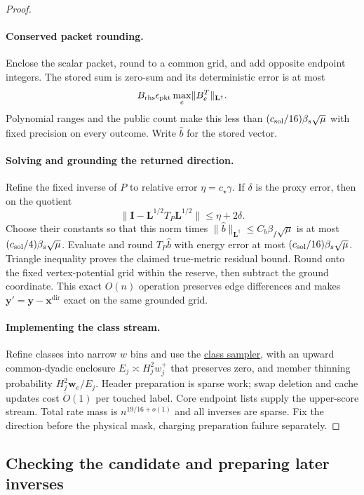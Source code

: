 \documentclass[11pt]{article}
\theoremstyle{remark}
\newcommand{\II}{\mathbf I}
\newcommand{\LL}{\mathbf L}
\newcommand{\ww}{\mathbf w}
\newcommand{\yy}{\mathbf y}
\newcommand{\xxdir}{\mathbf{x}^{\mathrm{dir}}}
\newcommand{\norm}[1]{\lVert#1\rVert}
\renewcommand{\O}{\ddot{O}}
\begin{document}
\begin{proof}
\paragraph{Conserved packet rounding.}
Enclose the scalar packet, round to a common grid, and add opposite endpoint
integers.
The stored sum is zero-sum and its deterministic error is at most
\[
 B_{\rm rhs}\epsilon_{\rm pkt}
                  \max_e\norm{B_e^T}_{\LL^\dagger}.
\]
Polynomial ranges and the public count make this less than $(c_{\rm
sol}/16)\beta_s\sqrt\mu$ with fixed precision on every outcome.
Write $\widehat b$ for the stored vector.

\paragraph{Solving and grounding the returned direction.}
Refine the fixed inverse of $P$ to relative error $\eta=c_\star\gamma$.
If $\delta$ is the proxy error, then on the quotient
\[
 \norm{\II-\LL^{1/2}T_P\LL^{1/2}}
                              \le\eta+2\delta.
\]
Choose their constants so that this norm times $\norm{\widehat
b}_{\LL^\dagger}\le C_b\beta_f\sqrt\mu$ is at most $(c_{\rm
sol}/4)\beta_s\sqrt\mu$.
Evaluate and round $T_P\widehat b$ with energy error at most $(c_{\rm
sol}/16)\beta_s\sqrt\mu$.
Triangle inequality proves the claimed true-metric residual bound.
Round onto the fixed vertex-potential grid within the reserve, then subtract the
ground coordinate.
This exact $O(n)$ operation preserves edge differences and makes $\yy'=\yy-\xxdir$
exact on the same grounded grid.

\paragraph{Implementing the class stream.}
Refine classes into narrow $w$ bins and use the
\hyperref[par:ram30-class-sampling]{class sampler}, with an upward common-dyadic
enclosure $E_j\asymp H_j^2w_j^+$ that preserves zero, and member thinning
probability $H_j^2\ww_e/E_j$.
Header preparation is sparse work; swap deletion and cache updates cost
$\O(1)$ per touched label.
Core endpoint lists supply the upper-score stream.
Total rate mass is $n^{19/16+o(1)}$ and all inverses are sparse.
Fix the direction before the physical mask, charging preparation failure
separately.
\end{proof}

\subsection{Checking the candidate and preparing later inverses}
\end{document}

